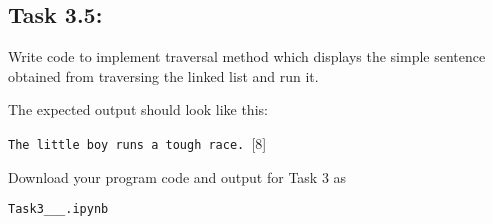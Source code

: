 \subsection*{Task 3.5:}

Write code to implement traversal method which displays the simple
sentence obtained from traversing the linked list and run it. 

The expected output should look like this:
\noindent \begin{center}
\texttt{The little boy runs a tough race. }\hfill{}{[}8{]}
\par\end{center}

Download your program code and output for Task 3 as

\texttt{Task3\_<your name>\_<centre number>\_<index number>.ipynb}